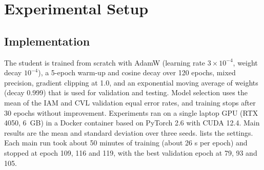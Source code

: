 \section{Experimental Setup}
\label{sec:exp}
\subsection{Implementation}
The student is trained from scratch with AdamW (learning rate $3\times10^{-4}$, weight decay $10^{-4}$), a 5-epoch warm-up and cosine decay over 120 epochs, mixed precision, gradient clipping at 1.0, and an exponential moving average of weights (decay 0.999) that is used for validation and testing.
Model selection uses the mean of the IAM and CVL validation equal error rates, and training stops after 30 epochs without improvement.
Experiments ran on a single laptop GPU (RTX 4050, 6~GB) in a Docker container based on PyTorch 2.6 with CUDA 12.4.
Main results are the mean and standard deviation over three seeds.
 lists the settings.
Each main run took about 50 minutes of training (about 26 s per epoch) and stopped at epoch 109, 116 and 119, with the best validation epoch at 79, 93 and 105.

\begin{table}[t]
\caption{Training and evaluation settings (from \texttt{config.yaml}).}
\label{tab:hyper}
\centering\scriptsize
{}
\end{table}

